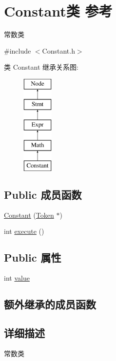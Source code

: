 \hypertarget{class_constant}{}\section{Constant类 参考}
\label{class_constant}


常数类  




{\ttfamily \#include $<$Constant.\+h$>$}

类 Constant 继承关系图\+:\begin{figure}[H]
\begin{center}
\leavevmode
\includegraphics[height=5.000000cm]{class_constant}
\end{center}
\end{figure}
\subsection*{Public 成员函数}
\begin{DoxyCompactItemize}
\item 
\hyperlink{class_constant_ad227bb35513aab43d86572343a1fe564}{Constant} (\hyperlink{class_token}{Token} $\ast$)
\item 
int \hyperlink{class_constant_ab5c55607bcff5ce70131a588b6bdbed7}{execute} ()
\end{DoxyCompactItemize}
\subsection*{Public 属性}
\begin{DoxyCompactItemize}
\item 
int \hyperlink{class_constant_a132c9bc0ec98681bcbf723d87ddd722d}{value}
\end{DoxyCompactItemize}
\subsection*{额外继承的成员函数}


\subsection{详细描述}
常数类 

